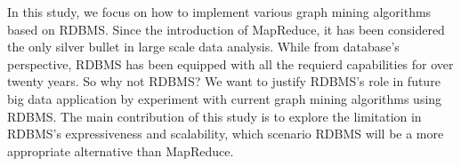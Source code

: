 In this study, we focus on how to implement various graph mining algorithms based on RDBMS. Since the introduction of MapReduce, it has been considered the only silver bullet in large scale data analysis. While from database's perspective, RDBMS has been equipped with all the requierd capabilities for over twenty years. So why not RDBMS? We want to justify RDBMS's role in future big data application by experiment with current graph mining algorithms using RDBMS. The main contribution of this study is to explore the limitation in RDBMS's expressiveness and scalability, which scenario RDBMS will be a more appropriate alternative than MapReduce. 